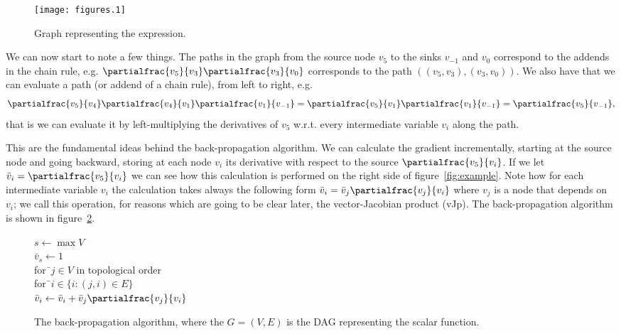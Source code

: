 \documentclass{article}
\begin{document}
\begin{figure}
\centering
\texttt{[image: figures.1]}
\caption{Graph representing the expression.}
\label{fig:dag}
\end{figure}

We can now start to note a few things. The paths in the graph from the source
node \(v_5\) to the sinks \(v_{-1}\) and \(v_0\) correspond to the addends in
the chain rule, e.g. \(\partialfrac{v_5}{v_3}\partialfrac{v_3}{v_0}\)
corresponds to the path \(((v_5,v_3), (v_3,v_0))\). We also have that we can
evaluate a path (or addend of a chain rule), from left to right, e.g. \[
\partialfrac{v_5}{v_4}\partialfrac{v_4}{v_1}\partialfrac{v_1}{v_{-1}}
= \partialfrac{v_5}{v_1}\partialfrac{v_1}{v_{-1}}
= \partialfrac{v_5}{v_{-1}},\]
that is we can evaluate it by left-multiplying the derivatives of \(v_5\)
w.r.t. every intermediate variable \(v_i\) along the path.

This are the fundamental ideas behind the back-propagation algorithm. We
can calculate the gradient incrementally, starting at the source node and going
backward, storing at each node \(v_i\) its derivative with respect to the
source \(\partialfrac{v_5}{v_i}\). If we let \(\bar v_i =
\partialfrac{v_5}{v_i}\) we can see how this calculation is performed on the
right side of figure~\ref{fig:example}. Note how for each intermediate variable
\(v_i\) the calculation takes always the following form
\(\bar v_i = \bar v_j \partialfrac{v_j}{v_i}\) where \(v_j\) is a node that
depends on \(v_i\); we call this operation, for reasons which are going to be
clear later, the vector-Jacobian product (vJp). The back-propagation algorithm
is shown in figure~\ref{fig:algorithm}.

\begin{figure}
\centering
\begin{minipage}{5cm}
\begin{tabbing}
\(s \leftarrow \max V\)\\
\(\bar v_s \leftarrow 1\)\\
for\=\ \(j \in V\) in topological order\\
\> for\=\ \(i \in \{i : (j, i) \in E\}\)\\
\> \> \(\displaystyle\bar v_i \leftarrow \bar v_i + \bar v_j \partialfrac{v_j}{v_i}\)
\end{tabbing}
\end{minipage}
\caption{The back-propagation algorithm, where the \(G = (V, E)\) is the DAG
representing the scalar function.}
\label{fig:algorithm}
\end{figure}
\end{document}
